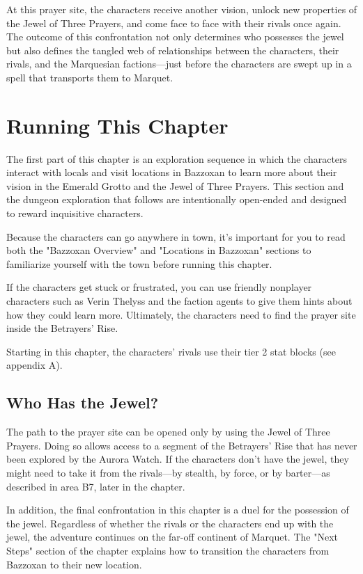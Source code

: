\documentclass[10pt,a4paper,twoside,twocolumn,openany,nodeprecatedcode]{dndbook}
\begin{document}
At this prayer site, the characters receive another vision, unlock new properties of the Jewel of Three Prayers, and come face to face with their rivals once again. The outcome of this confrontation not only determines who possesses the jewel but also defines the tangled web of relationships between the characters, their rivals, and the Marquesian factions—just before the characters are swept up in a spell that transports them to Marquet.

\section{Running This Chapter}
The first part of this chapter is an exploration sequence in which the characters interact with locals and visit locations in Bazzoxan to learn more about their vision in the Emerald Grotto and the Jewel of Three Prayers. This section and the dungeon exploration that follows are intentionally open-ended and designed to reward inquisitive characters.

Because the characters can go anywhere in town, it's important for you to read both the "Bazzoxan Overview" and "Locations in Bazzoxan" sections to familiarize yourself with the town before running this chapter.

If the characters get stuck or frustrated, you can use friendly nonplayer characters such as Verin Thelyss and the faction agents to give them hints about how they could learn more. Ultimately, the characters need to find the prayer site inside the Betrayers' Rise.

Starting in this chapter, the characters' rivals use their tier 2 stat blocks (see appendix A).

\subsection{Who Has the Jewel?}
The path to the prayer site can be opened only by using the Jewel of Three Prayers. Doing so allows access to a segment of the Betrayers' Rise that has never been explored by the Aurora Watch. If the characters don't have the jewel, they might need to take it from the rivals—by stealth, by force, or by barter—as described in area B7, later in the chapter.

In addition, the final confrontation in this chapter is a duel for the possession of the jewel. Regardless of whether the rivals or the characters end up with the jewel, the adventure continues on the far-off continent of Marquet. The "Next Steps" section of the chapter explains how to transition the characters from Bazzoxan to their new location.
\end{document}
